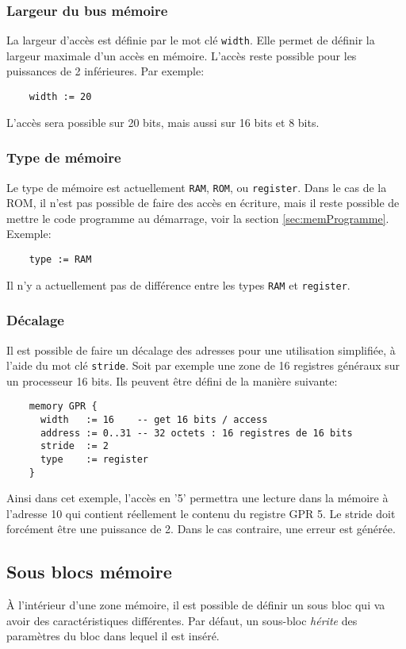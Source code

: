 \subsubsection{Largeur du bus mémoire}
La largeur d'accès est définie par le mot clé \texttt{width}. Elle permet de définir la largeur maximale d'un accès en mémoire. L'accès reste possible pour les puissances de 2 inférieures. Par exemple:
\begin{lstlisting}
    width := 20  
\end{lstlisting}
L'accès sera possible sur 20 bits, mais aussi sur 16 bits et 8 bits.

\subsubsection{Type de mémoire}
Le type de mémoire est actuellement \texttt{RAM}, \texttt{ROM}, ou \texttt{register}. Dans le cas de la ROM, il n'est pas possible de faire des accès en écriture, mais il reste possible de mettre le code programme au démarrage, voir la section \ref{sec:memProgramme}. Exemple:
\begin{lstlisting}
    type := RAM
\end{lstlisting}

Il n'y a actuellement pas de différence entre les types \texttt{RAM} et \texttt{register}.

\subsubsection{Décalage}
Il est possible de faire un décalage des adresses pour une utilisation simplifiée, à l'aide du mot clé \texttt{stride}. Soit par exemple une zone de 16 registres généraux sur un processeur 16 bits. Ils peuvent être défini de la manière suivante:
\begin{lstlisting}
    memory GPR {
      width   := 16    -- get 16 bits / access
      address := 0..31 -- 32 octets : 16 registres de 16 bits
      stride  := 2 
      type    := register 
    }
\end{lstlisting}
Ainsi dans cet exemple, l'accès en '5' permettra une lecture dans la mémoire à l'adresse 10 qui contient réellement le contenu du registre GPR 5.
Le stride doit forcément être une puissance de 2. Dans le cas contraire, une erreur est générée.

\subsection{Sous blocs mémoire}
À l'intérieur d'une zone mémoire, il est possible de définir un sous bloc qui va avoir des caractéristiques différentes. Par défaut, un sous-bloc \emph{hérite} des paramètres du bloc dans lequel il est inséré. 

